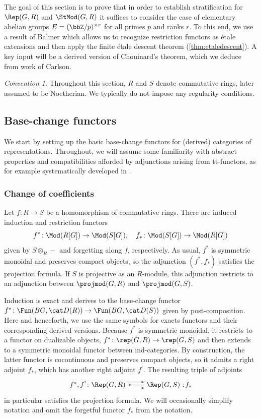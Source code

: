 \documentclass{amsart}%
\numberwithin{equation}{section}%
\theoremstyle{remark}
\newtheorem{Conv}[equation]{Convention}
\newcommand\noloc{%
  \nobreak
  \mspace{6mu plus 1mu}
  {:}
  \nonscript\mkern-\thinmuskip
  \mathpunct{}
  \mspace{2mu}
}
\begin{document}
The goal of this section is to prove that in order to establish stratification for $\Rep(G,R)$ and $\StMod(G,R)$ it suffices to consider the case of elementary abelian groups $E = (\bbZ/p)^{\times r}$ for all primes $p$ and ranks $r$. To this end, we use a result of Balmer which allows us to recognize restriction functors as \'etale extensions and then apply the finite \'etale descent theorem (\cref{thm:etaledescent}). A key input will be a derived version of Chouinard's theorem, which we deduce from work of Carlson.

\begin{Conv}
Throughout this section, $R$ and $S$ denote commutative rings, later assumed to be Noetherian. We typically do not impose any regularity conditions. 
\end{Conv}


\subsection{Base-change functors}\label{ssec:basechange}

We start by setting up the basic base-change functors for (derived) categories of representations. Throughout, we will assume some familiarity with abstract properties and compatibilities afforded by adjunctions arising from tt-functors, as for example systematically developed in \cite{BalmerDellAmbrogioSanders15}. 


\subsubsection{Change of coefficients}

Let $f\colon R \to S$ be a homomorphism of commutative rings. There are induced induction and restriction functors
\[
f^*\colon \Mod(R[G]) \to \Mod(S[G]), \quad f_*\colon \Mod(S[G]) \to \Mod(R[G])
\]
given by $S\otimes_R-$ and forgetting along $f$, respectively. As usual, $f^*$ is symmetric monoidal and preserves compact objects, so the adjunction $(f^*,f_*)$ satisfies the projection formula. If $S$ is projective as an $R$-module, this adjunction restricts to an adjunction between $\projmod(G,R)$ and $\projmod(G,S)$. 

Induction is exact and derives to the base-change functor $f^*\colon \Fun(BG,\cat D(R)) \to \Fun(BG,\cat D(S))$ given by post-composition. Here and henceforth, we use the same symbols for exacts functors and their corresponding derived versions. Because $f^*$ is symmetric monoidal, it restricts to a functor on dualizable objects, $f^*\colon \rep(G,R) \to \rep(G,S)$ and then extends to a symmetric monoidal functor between ind-categories. By construction, the latter functor is cocontinuous and preserves compact objects, so it admits a right adjoint $f_*$, which has another right adjoint $f^!$. The resulting triple of adjoints
\[
\xymatrix{f^*,f^!\colon \Rep(G,R) \ar@<1ex>[r] \ar@<-1ex>[r] & \Rep(G,S)\noloc f_* \ar[l]}
\]
in particular satisfies the projection formula. We will occasionally simplify notation and omit the forgetful functor $f_*$ from the notation.
\end{document}

